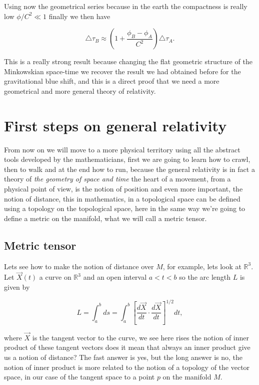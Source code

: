         Using now the geometrical series because in the earth the compactness is really low $\phi/C^2 \ll 1$ finally we then have

        \begin{equation}
            \triangle\tau_B\approx \left(1 + \frac{\phi_B - \phi_A}{C^2}\right)\triangle\tau_A.
        \end{equation}

        This is a really strong result because changing the flat geometric structure of the Minkowskian space-time we recover the result we had obtained before for the gravitational blue shift, and this is a direct proof that we need a more geometrical and more general theory of relativity.

\section{First steps on general relativity}

    From now on we will move to a more physical territory using all the abstract tools developed by the mathematicians, first we are going to learn how to crawl, then to walk and at the end how to run, because the general relativity is in fact a theory of \textit{the geometry of space and time} the heart of a movement, from a physical point of view, is the notion of position and even more important, the notion of distance, this in mathematics, in a topological space can be defined using a topology on the topological space, here in the same way we're going to define a metric on the manifold, what we will call a metric tensor.

    \subsection{Metric tensor}

        Lets see how to make the notion of distance over $M$, for example, lets look at $\mathbb{R}^3$. Let $\Vec{X}(t)$ a curve on $\mathbb{R}^3$ and an open interval $a < t < b$ so the arc length $L$ is given by

        \begin{equation}
            L = \int_a^b ds = \int_a^b \left[\frac{d\Vec{X}}{dt}\cdot \frac{d\Vec{X}}{dt}\right]^{1/2}dt,
        \end{equation}

        where $\Vec{X}$ is the tangent vector to the curve, we see here rises the notion of inner product of these tangent vectors does it mean that always an inner product give us a notion of distance? The fast answer is yes, but the long answer is no, the notion of inner product is more related to the notion of a topology of the vector space, in our case of the tangent space to a point $p$ on the manifold $M$.\\

